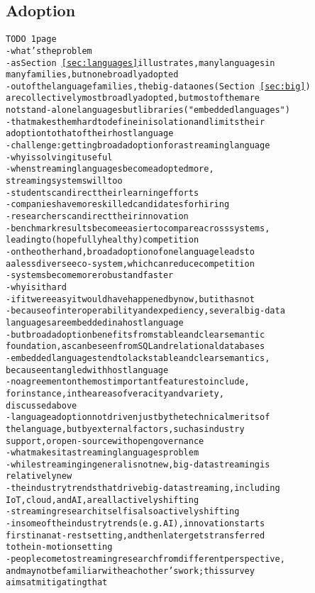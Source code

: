 \subsection{Adoption}\label{sec:adoption} %

\begin{alltt}TODO\scriptsize ~1 page
- what's the problem
  - as Section~\ref{sec:languages} illustrates, many languages in
    many families, but none broadly adopted
  - out of the language families, the big-data ones (Section~\ref{sec:big})
    are collectively most broadly adopted, but most of them are
    not stand-alone languages but libraries ("embedded languages")
  - that makes them hard to define in isolation and limits their
    adoption to that of their host language
  - challenge: getting broad adoption for a streaming language
- why is solving it useful
  - when streaming languages become adopted more,
    streaming systems will too
  - students can direct their learning efforts
  - companies have more skilled candidates for hiring
  - researchers can direct their innovation
  - benchmark results become easier to compare across systems,
    leading to (hopefully healthy) competition
    - on the other hand, broad adoption of one language leads to
      a a less diverse eco-system, which can reduce competition
  - systems become more robust and faster
- why is it hard
  - if it were easy it would have happened by now, but it has not
  - because of interoperability and expediency, several big-data
    languages are embedded in a host language
  - but broad adoption benefits from stable and clear semantic
    foundation, as can be seen from SQL and relational databases
  - embedded languages tend to lack stable and clear semantics,
    because entangled with host language
  - no agreement on the most important features to include,
    for instance, in the areas of veracity and variety,
    discussed above
  - language adoption not driven just by the technical merits of
    the language, but by external factors, such as industry
    support, or open-source with open governance
- what makes it a streaming languages problem
  - while streaming in general is not new, big-data streaming is
    relatively new
  - the industry trends that drive big-data streaming, including
    IoT, cloud, and AI, are all actively shifting
  - streaming research itself is also actively shifting
  - in some of the industry trends (e.g. AI), innovation starts
    first in an at-rest setting, and then later gets transferred
    to the in-motion setting
  - people come to streaming research from different perspective,
    and may not be familiar with each other's work; this survey
    aims at mitigating that
\end{alltt}

